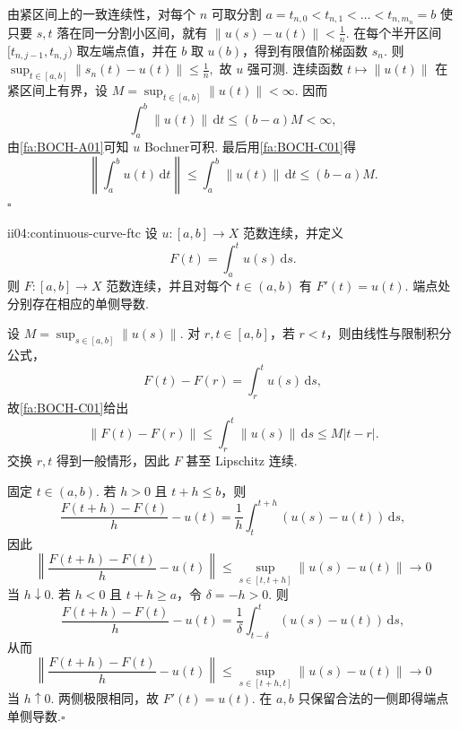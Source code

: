 \begin{FAProof}
由紧区间上的一致连续性，对每个 \(\displaystyle n\) 可取分割
\(\displaystyle a=t_{n,0}<t_{n,1}<\dots<t_{n,m_n}=b\)
使只要 \(\displaystyle s,t\) 落在同一分割小区间，就有 \(\displaystyle\|u(s)-u(t)\|<\frac{1}{n}\). 在每个半开区间 \(\displaystyle[t_{n,j-1},t_{n,j})\) 取左端点值，并在 \(\displaystyle b\) 取 \(\displaystyle u(b)\)，得到有限值阶梯函数 \(\displaystyle s_n\). 则
\(\displaystyle \sup_{t\in[a,b]}\|s_n(t)-u(t)\| \leqslant \frac{1}{n},\)
故 \(\displaystyle u\) 强可测. 连续函数 \(\displaystyle t\mapsto\|u(t)\|\) 在紧区间上有界，设 \(\displaystyle M=\sup_{t\in[a,b]}\|u(t)\|<\infty\). 因而
\[
\int_a^b\|u(t)\|\,\mathrm{d}t
\leqslant
(b-a)M<\infty,
\]
由\autoref{fa:BOCH-A01}可知 \(\displaystyle u\) Bochner可积. 最后用\autoref{fa:BOCH-C01}得
\[
\left\|\int_a^bu(t)\,\mathrm{d}t\right\|
\leqslant
\int_a^b\|u(t)\|\,\mathrm{d}t
\leqslant
(b-a)M.\]\hfill\(\square\)


\end{FAProof}

\begin{FATheorem}[C][连续曲线的Bochner基本微积分定理]{ii04:continuous-curve-ftc}
设 \(\displaystyle u:[a,b]\to X\) 范数连续，并定义
\[
F(t)=\int_a^tu(s)\,\mathrm{d}s.
\]
则 \(\displaystyle F:[a,b]\to X\) 范数连续，并且对每个 \(\displaystyle t\in(a,b)\) 有
\(\displaystyle F'(t)=u(t).\)
端点处分别存在相应的单侧导数.
\end{FATheorem}

\begin{FAProof}
设 \(\displaystyle M=\sup_{s\in[a,b]}\|u(s)\|\). 对 \(\displaystyle r,t\in[a,b]\)，若 \(\displaystyle r<t\)，则由线性与限制积分公式，
\[
F(t)-F(r)=\int_r^tu(s)\,\mathrm{d}s,
\]
故\autoref{fa:BOCH-C01}给出
\[
\|F(t)-F(r)\|
\leqslant
\int_r^t\|u(s)\|\,\mathrm{d}s
\leqslant
M|t-r|.
\]
交换 \(\displaystyle r,t\) 得到一般情形，因此 \(\displaystyle F\) 甚至 Lipschitz 连续.

固定 \(\displaystyle t\in(a,b)\). 若 \(\displaystyle h>0\) 且 \(\displaystyle t+h\leqslant b\)，则
\[
\frac{F(t+h)-F(t)}{h}-u(t)
=
\frac{1}{h}\int_t^{t+h}(u(s)-u(t))\,\mathrm{d}s,
\]
因此
\[
\left\|
\frac{F(t+h)-F(t)}{h}-u(t)
\right\|
\leqslant
\sup_{s\in[t,t+h]}\|u(s)-u(t)\|
\longrightarrow0
\]
当 \(\displaystyle h\downarrow0\). 若 \(\displaystyle h<0\) 且 \(\displaystyle t+h\geqslant a\)，令 \(\displaystyle\delta=-h>0\). 则
\[
\frac{F(t+h)-F(t)}{h}-u(t)
=
\frac1\delta\int_{t-\delta}^{t}(u(s)-u(t))\,\mathrm{d}s,
\]
从而
\[
\left\|
\frac{F(t+h)-F(t)}{h}-u(t)
\right\|
\leqslant
\sup_{s\in[t+h,t]}\|u(s)-u(t)\|
\longrightarrow0
\]
当 \(\displaystyle h\uparrow0\). 两侧极限相同，故 \(\displaystyle F'(t)=u(t)\). 在 \(\displaystyle a,b\) 只保留合法的一侧即得端点单侧导数.\hfill\(\square\)
\end{FAProof}

